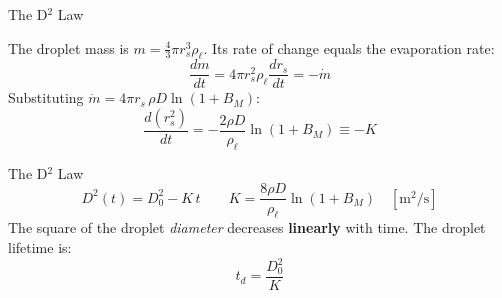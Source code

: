 \documentclass[12pt,aspectratio=169]{beamer}
\newcommand{\mdot}{\dot{m}}
\newcommand{\rs}{r_s}
\newcommand{\BM}{B_M}
\newcommand{\Kd}{K}
\newcommand{\td}{t_d}
\begin{document}
\begin{frame}{The D$^2$ Law}

  The droplet mass is $m = \tfrac{4}{3}\pi\rs^3\rho_\ell$.
  Its rate of change equals the evaporation rate:
  \[
    \frac{dm}{dt} = 4\pi\rs^2\rho_\ell\frac{d\rs}{dt} = -\mdot
  \]
  Substituting $\mdot = 4\pi\rs\,\rho D\ln(1+\BM)$:
  \[
    \frac{d(\rs^2)}{dt} = -\frac{2\rho D}{\rho_\ell}\ln(1+\BM)
    \equiv -\Kd
  \]

  \begin{block}{The D$^2$ Law}
    \[
      \boxed{D^2(t) = D_0^2 - \Kd\,t}
      \qquad
      \Kd = \frac{8\rho D}{\rho_\ell}\ln(1+\BM)
      \quad [\text{m}^2/\text{s}]
    \]
    The square of the droplet \emph{diameter} decreases
    \textbf{linearly} with time.
    The droplet lifetime is:
    \[
      \td = \frac{D_0^2}{\Kd}
    \]
  \end{block}
\end{frame}
\end{document}
